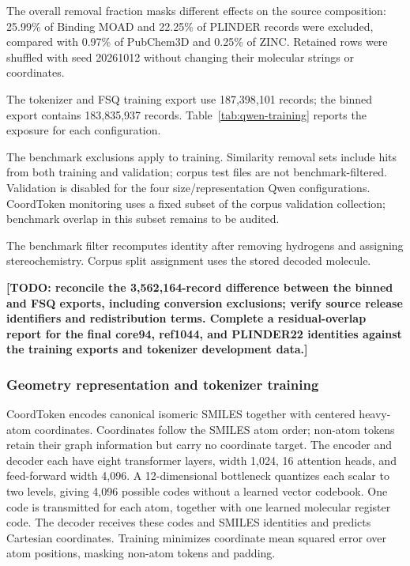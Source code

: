 The overall removal fraction masks different effects on the source composition:
25.99\% of Binding MOAD and 22.25\% of PLINDER records were excluded, compared with
0.97\% of PubChem3D and 0.25\% of ZINC. Retained rows were shuffled with seed
20261012 without changing their molecular strings or coordinates.

The tokenizer and FSQ training export use 187,398,101 records; the binned export
contains 183,835,937 records. Table~\ref{tab:qwen-training} reports the exposure for
each configuration.

The benchmark exclusions apply to training. Similarity removal sets include hits
from both training and validation; corpus test files are not benchmark-filtered.
Validation is disabled for the four size/representation Qwen configurations.
CoordToken monitoring uses a fixed subset of the corpus validation collection;
benchmark overlap in this subset remains to be audited.

The benchmark filter recomputes identity after removing hydrogens and assigning
stereochemistry. Corpus split assignment uses the stored decoded molecule.

\textbf{[TODO: reconcile the 3,562,164-record difference between the binned and FSQ
exports, including conversion exclusions; verify source release identifiers and
redistribution terms. Complete a residual-overlap report for the final core94,
ref1044, and PLINDER22 identities against the training exports and tokenizer
development data.]}

\subsubsection*{Geometry representation and tokenizer training}

CoordToken\cite{geikyan2026coordtoken} encodes canonical isomeric SMILES together
with centered heavy-atom coordinates. Coordinates follow the SMILES atom order;
non-atom tokens retain their graph information but carry no coordinate target.
The encoder and decoder each have eight transformer layers, width 1,024, 16 attention
heads, and feed-forward width 4,096. A 12-dimensional bottleneck quantizes each scalar
to two levels, giving 4,096 possible codes without a learned vector codebook.
One code is transmitted for each atom, together with one learned molecular register
code. The decoder receives these codes and SMILES identities and predicts Cartesian
coordinates. Training minimizes coordinate mean squared error over atom positions,
masking non-atom tokens and padding.

